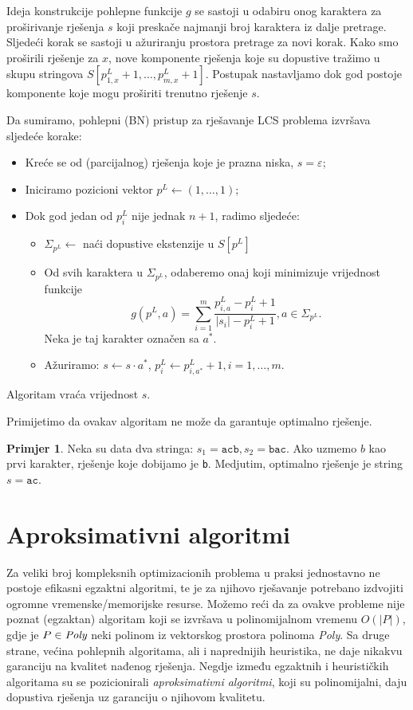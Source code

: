 \documentclass[a4paper, utf8, 11pt, colorlinks]{book}
\theoremstyle{definition}
\newtheorem{primjer}{Primjer}[chapter]
\begin{document}
 Ideja konstrukcije pohlepne funkcije $g$ se sastoji u odabiru onog karaktera za proširivanje rješenja $s$ koji preskače najmanji broj karaktera iz dalje pretrage. Sljedeći korak se sastoji u ažuriranju prostora pretrage za novi korak. Kako smo proširili rješenje za $x$, nove komponente rješenja koje su dopustive tražimo u skupu stringova $S[p^L_{1,x}+1,\ldots, p^L_{m, x}+1]$. Postupak nastavljamo dok god postoje komponente koje mogu proširiti trenutno rješenje $s$. 


\noindent Da sumiramo, pohlepni (BN) pristup za rješavanje LCS problema izvršava sljedeće korake:
\begin{itemize}
	\item Kreće se od (parcijalnog) rješenja koje je prazna niska, $s=\varepsilon$;
	\item Iniciramo pozicioni vektor $p^L \gets (1,\ldots, 1) $;
	\item Dok god jedan od $p^L_i$ nije jednak $n+1$, radimo sljedeće: 
	\begin{itemize}
   	     \item $\Sigma_{p^L} \gets$ naći dopustive ekstenzije u $S[p^L]$
	      \item Od svih karaktera u $\Sigma_{p^L}$, odaberemo onaj koji minimizuje vrijednost funkcije 
	      $$g( p^L,a) = \sum_{i=1}^m\frac{p^L_{i,a} - p^L_i + 1 }{|s_i| - p^L_i + 1 }, a \in \Sigma_{ p^L }.$$
	      Neka je taj karakter označen sa $a^*$. 
	      \item Ažuriramo: $s \gets  s \cdot a^*$, $p^L_i \gets p^L_{i, a^*} +1, i = 1,\ldots,m.$
    \end{itemize}
\end{itemize}
Algoritam vraća vrijednost $s$. 

Primijetimo da ovakav algoritam ne može da garantuje optimalno rješenje. 

\begin{primjer} Neka su data dva stringa: $s_1 = \texttt{acb}, s_2 = \texttt{bac}$. Ako uzmemo  $ b$ kao prvi karakter, rješenje koje dobijamo je \texttt{b}. Medjutim, optimalno rješenje je string $s=\texttt{ac}$. 
	\end{primjer}

\section{Aproksimativni algoritmi} 
  
   Za veliki broj kompleksnih optimizacionih problema u praksi jednostavno ne postoje efikasni egzaktni algoritmi, te je za  njihovo rješavanje potrebano izdvojiti ogromne vremenske/memorijske resurse. Možemo reći da za  ovakve probleme nije poznat (egzaktan) algoritam koji se izvršava u polinomijalnom vremenu $O(|P|)$, gdje je $P \in \emph{Poly}$ neki polinom iz vektorskog prostora polinoma \emph{Poly}. Sa druge strane, većina pohlepnih algoritama, ali i naprednijih heuristika, ne daje nikakvu garanciju na kvalitet nađenog rješenja. Negdje između egzaktnih i heurističkih algoritama su se pozicionirali \emph{aproksimativni algoritmi}, koji su polinomijalni, daju dopustiva rješenja uz garanciju o njihovom kvalitetu. 
  
\end{document}
